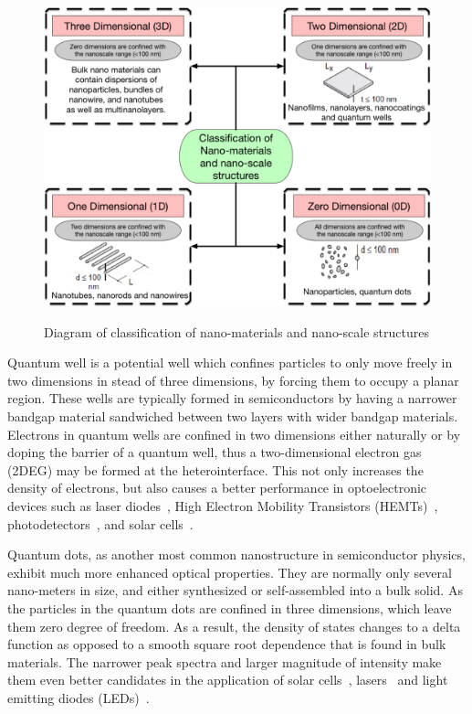 \begin{figure}
  \caption{Diagram of classification of nano-materials and nano-scale structures}
  \centering
  \includegraphics[width=\textwidth]{pictures/Introduction/Nanomaterials}
  \label{Nanomaterials}
\end{figure}

Quantum well is a potential well which confines particles to only move freely
in two dimensions in stead of three dimensions, by forcing them to occupy a
planar region. These wells are typically formed in semiconductors by having a
narrower bandgap material sandwiched between two layers with wider bandgap
materials. Electrons in quantum wells are confined in two dimensions either
naturally or by doping the barrier of a quantum well, thus a two-dimensional
electron gas (2DEG) may be formed at the heterointerface. This not only
increases the density of electrons, but also causes a better performance in
optoelectronic devices such as laser diodes~\cite{nakamura1996ingan}, High
Electron Mobility Transistors (HEMTs)~\cite{kuzmik2002inaln,rosenberg19850},
photodetectors~\cite{levine1993quantum,liu2004terahertz}, and solar
cells~\cite{barnham2002quantum,ekins1999strain}.

Quantum dots, as another most common nanostructure in semiconductor physics,
exhibit much more enhanced optical properties. They are normally only several
nano-meters in size, and either synthesized or self-assembled into a bulk
solid. As the particles in the quantum dots are confined in three dimensions,
which leave them zero degree of freedom. As a result, the density of states
changes to a delta function as opposed to a smooth square root dependence that
is found in bulk materials. The narrower peak spectra and larger magnitude of
intensity make them even better candidates in the application of solar
cells~\cite{nozik2002quantum},
lasers~\cite{klimov2000optical,ustinov2003quantum} and light emitting diodes
(LEDs)~\cite{park2001band,sun2007bright}.

